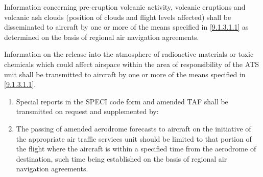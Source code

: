 \begin{enumeratesc}
    \begin{enumempty}
        \item Information concerning pre-eruption volcanic activity, volcanic eruptions and volcanic ash clouds (position of clouds and flight levels affected) shall be disseminated to aircraft by one or more of the means specified in \ref{9.1.3.1.1} as determined on the basis of regional air navigation agreements.
    \end{enumempty}

    \begin{enumempty}
        \item Information on the release into the atmosphere of radioactive materials or toxic chemicals which could affect airspace within the area of responsibility of the ATS unit shall be transmitted to aircraft by one or more of the means specified in \ref{9.1.3.1.1}.
    \end{enumempty}

    \begin{enumerate}
        \item Special reports in the SPECI code form and amended TAF shall be transmitted on request and supplemented by:

        \item The passing of amended aerodrome forecasts to aircraft on the initiative of the appropriate air traffic services unit should be limited to that portion of the flight where the aircraft is within a specified time from the aerodrome of destination, such time being established on the basis of regional air navigation agreements.
    \end{enumerate}


\end{enumeratesc}

